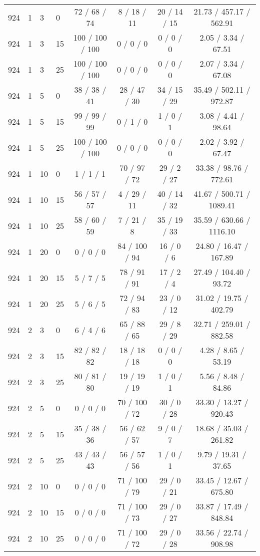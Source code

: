 \begin{table}[p]
\begin{tabular}{llllcccc}
924 & 1 & 3 & 0 & 72 / 68 / 74 & 8 / 18 / 11 & 20 / 14 / 15 & 21.73 / 457.17 / 562.91 \\
924 & 1 & 3 & 15 & 100 / 100 / 100 & 0 / 0 / 0 & 0 / 0 / 0 & 2.05 / 3.34 / 67.51 \\
924 & 1 & 3 & 25 & 100 / 100 / 100 & 0 / 0 / 0 & 0 / 0 / 0 & 2.07 / 3.34 / 67.08 \\
924 & 1 & 5 & 0 & 38 / 38 / 41 & 28 / 47 / 30 & 34 / 15 / 29 & 35.49 / 502.11 / 972.87 \\
924 & 1 & 5 & 15 & 99 / 99 / 99 & 0 / 1 / 0 & 1 / 0 / 1 & 3.08 / 4.41 / 98.64 \\
924 & 1 & 5 & 25 & 100 / 100 / 100 & 0 / 0 / 0 & 0 / 0 / 0 & 2.02 / 3.92 / 67.47 \\
924 & 1 & 10 & 0 & 1 / 1 / 1 & 70 / 97 / 72 & 29 / 2 / 27 & 33.38 / 98.76 / 772.61 \\
924 & 1 & 10 & 15 & 56 / 57 / 57 & 4 / 29 / 11 & 40 / 14 / 32 & 41.67 / 500.71 / 1089.41 \\
924 & 1 & 10 & 25 & 58 / 60 / 59 & 7 / 21 / 8 & 35 / 19 / 33 & 35.59 / 630.66 / 1116.10 \\
924 & 1 & 20 & 0 & 0 / 0 / 0 & 84 / 100 / 94 & 16 / 0 / 6 & 24.80 / 16.47 / 167.89 \\
924 & 1 & 20 & 15 & 5 / 7 / 5 & 78 / 91 / 91 & 17 / 2 / 4 & 27.49 / 104.40 / 93.72 \\
924 & 1 & 20 & 25 & 5 / 6 / 5 & 72 / 94 / 83 & 23 / 0 / 12 & 31.02 / 19.75 / 402.79 \\
924 & 2 & 3 & 0 & 6 / 4 / 6 & 65 / 88 / 65 & 29 / 8 / 29 & 32.71 / 259.01 / 882.58 \\
924 & 2 & 3 & 15 & 82 / 82 / 82 & 18 / 18 / 18 & 0 / 0 / 0 & 4.28 / 8.65 / 53.19 \\
924 & 2 & 3 & 25 & 80 / 81 / 80 & 19 / 19 / 19 & 1 / 0 / 1 & 5.56 / 8.48 / 84.86 \\
924 & 2 & 5 & 0 & 0 / 0 / 0 & 70 / 100 / 72 & 30 / 0 / 28 & 33.30 / 13.27 / 920.43 \\
924 & 2 & 5 & 15 & 35 / 38 / 36 & 56 / 62 / 57 & 9 / 0 / 7 & 18.68 / 35.03 / 261.82 \\
924 & 2 & 5 & 25 & 43 / 43 / 43 & 56 / 57 / 56 & 1 / 0 / 1 & 9.79 / 19.31 / 37.65 \\
924 & 2 & 10 & 0 & 0 / 0 / 0 & 71 / 100 / 79 & 29 / 0 / 21 & 33.45 / 12.67 / 675.80 \\
924 & 2 & 10 & 15 & 0 / 0 / 0 & 71 / 100 / 73 & 29 / 0 / 27 & 33.87 / 17.49 / 848.84 \\
924 & 2 & 10 & 25 & 0 / 0 / 0 & 71 / 100 / 72 & 29 / 0 / 28 & 33.56 / 22.74 / 908.98 \\

\end{tabular}
\end{table}
